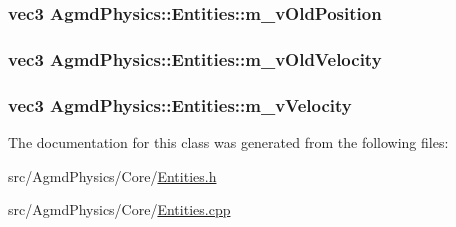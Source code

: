 \hypertarget{class_agmd_physics_1_1_entities_a5e4912e93fa4ef73322fb914ded928ad}{
\subsubsection[{m\+\_\+v\+Old\+Position}]{\setlength{\rightskip}{0pt plus 5cm}vec3 Agmd\+Physics\+::\+Entities\+::m\+\_\+v\+Old\+Position\hspace{0.3cm}{\ttfamily [protected]}}}\label{class_agmd_physics_1_1_entities_a5e4912e93fa4ef73322fb914ded928ad}
\hypertarget{class_agmd_physics_1_1_entities_a5218b950670a50f7be85078b3a23e365}{
\subsubsection[{m\+\_\+v\+Old\+Velocity}]{\setlength{\rightskip}{0pt plus 5cm}vec3 Agmd\+Physics\+::\+Entities\+::m\+\_\+v\+Old\+Velocity\hspace{0.3cm}{\ttfamily [protected]}}}\label{class_agmd_physics_1_1_entities_a5218b950670a50f7be85078b3a23e365}
\hypertarget{class_agmd_physics_1_1_entities_af45db51319ed7ee80233d9f950bc6628}{
\subsubsection[{m\+\_\+v\+Velocity}]{\setlength{\rightskip}{0pt plus 5cm}vec3 Agmd\+Physics\+::\+Entities\+::m\+\_\+v\+Velocity\hspace{0.3cm}{\ttfamily [protected]}}}\label{class_agmd_physics_1_1_entities_af45db51319ed7ee80233d9f950bc6628}


The documentation for this class was generated from the following files\+:\begin{DoxyCompactItemize}
\item 
src/\+Agmd\+Physics/\+Core/\hyperlink{_agmd_physics_2_core_2_entities_8h}{Entities.\+h}\item 
src/\+Agmd\+Physics/\+Core/\hyperlink{_agmd_physics_2_core_2_entities_8cpp}{Entities.\+cpp}\end{DoxyCompactItemize}
